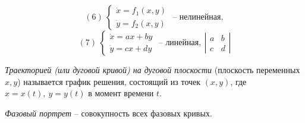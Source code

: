 \[
	(6) \ \left\{\begin{array}{l}
		\dot{x} = f_1(x,y) \\
		\dot{y} = f_2(x,y)
	\end{array}\right. \text{ -- нелинейная},
\]
\[
	(7) \ \left\{\begin{array}{l}
		\dot{x} = ax + by \\
		\dot{y} = cx + dy
	\end{array}\right. \text{ -- линейная}, \ \left|\begin{array}{cc}
		a & b \\ c & d
	\end{array}\right|
\]

\begin{definition}
	\emph{Траекторией (или дуговой кривой) на дуговой плоскости} (плоскость переменных $x,y$) называется график решения, состоящий из точек $(x,y)$, где $x = x(t), \ y = y(t)$ в момент времени $t$.
\end{definition}

\begin{definition}
	\emph{Фазовый портрет} -- совокупность всех фазовых кривых.
\end{definition}

